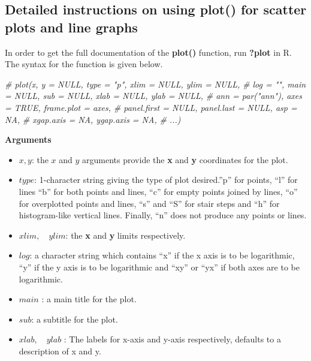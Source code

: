 \documentclass[
]{book}
\newenvironment{Shaded}{\begin{snugshade}}{\end{snugshade}}
\newcommand{\CommentTok}[1]{\textcolor[rgb]{0.56,0.35,0.01}{\textit{#1}}}
\providecommand{\tightlist}{%
  \setlength{\itemsep}{0pt}\setlength{\parskip}{0pt}}
\begin{document}
\subsection{Detailed instructions on using plot() for scatter plots and line graphs}\label{detailed-instructions-on-using-plot-for-scatter-plots-and-line-graphs}

In order to get the full documentation of the \textbf{plot()} function, run \textbf{?plot} in R. The syntax for the function is given below.

\begin{Shaded}
\begin{Highlighting}[]
\CommentTok{\# plot(x, y = NULL, type = "p",  xlim = NULL, ylim = NULL,}
\CommentTok{\#     log = "", main = NULL, sub = NULL, xlab = NULL, ylab = NULL,}
\CommentTok{\#     ann = par("ann"), axes = TRUE, frame.plot = axes,}
\CommentTok{\#     panel.first = NULL, panel.last = NULL, asp = NA,}
\CommentTok{\#     xgap.axis = NA, ygap.axis = NA,}
\CommentTok{\#     ...)}
\end{Highlighting}
\end{Shaded}

\textbf{Arguments}

\begin{itemize}
\tightlist
\item
  \(x, y\): the \(x\) and \(y\) arguments provide the \textbf{x} and \textbf{y} coordinates for the plot.
\item
  \(type\): 1-character string giving the type of plot desired.''p'' for points, ``l'' for lines ``b'' for both points and lines, ``c'' for empty points joined by lines, ``o'' for overplotted points and lines, ``s'' and ``S'' for stair steps and ``h'' for histogram-like vertical lines. Finally, ``n'' does not produce any points or lines.
\item
  \(xlim,\quad ylim\): the \textbf{x} and \textbf{y} limits respectively.
\item
  \(log\): a character string which contains ``x'' if the x axis is to be logarithmic, ``y'' if the y axis is to be logarithmic and ``xy'' or ``yx'' if both axes are to be logarithmic.
\item
  \(main\) : a main title for the plot.
\item
  \(sub\): a subtitle for the plot.
\item
  \(xlab,\quad ylab\) : The labels for x-axis and y-axis respectively, defaults to a description of x and y.
\end{itemize}
\end{document}
